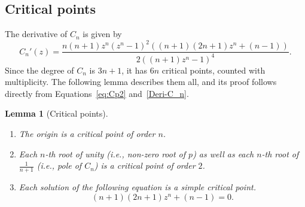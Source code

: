 \documentclass[12pt]{article}
\newtheorem{lem}{Lemma}[section]
\begin{document}
\subsection{Critical points}  The derivative of $C_n$ is given by
\begin{equation}\label{Deri-C_n}
	C_n'(z)=\frac{n(n+1)z^n(z^n-1)^2((n+1)(2n+1)z^n+(n-1))}{2((n+1)z^n-1)^4}.
\end{equation}
Since the degree of $C_n$ is $3n+1$, it has $6n$ critical points, counted with multiplicity. The following lemma describes them all, and its proof follows directly from Equations~\eqref{eq:Cp2} and~\eqref{Deri-C_n}.
	\begin{lem}[Critical points]
	\begin{enumerate}
		\item The  origin is a critical point  of order $n$.
		\item Each $n$-th root of unity (i.e., non-zero root of $p$)  as well as each $n$-th root of $\frac{1}{n+1}$ (i.e., pole of $C_n$) is a critical point of order $2$.
		\item Each solution of the following equation is a simple critical point.
		\begin{equation}\label{free_cr_eqn}
			(n+1)(2n+1)z^n+(n-1)=0.
		\end{equation} 
	\end{enumerate}  
	\end{lem}
	
\end{document}
